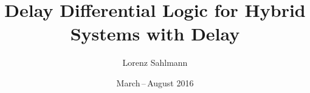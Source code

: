 \documentclass[
    final,
    fontsize=10pt,
    a4paper,
    oneside,
    abstract=on,
    toc=bibliographynumbered
]{scrreprt}
\newcommand*{\cdepartment}{}%
\newcommand*{\department}[1]{\gdef\cdepartment{#1}}
\newcommand*{\cinstitution}{}%
\newcommand*{\institution}[1]{\gdef\cinstitution{#1}}
\newcommand*{\csupervisor}{}%
\newcommand*{\supervisor}[1]{\gdef\csupervisor{#1}}
\newcommand*{\csupervisorinst}{}%
\newcommand*{\supervisorinst}[1]{\gdef\csupervisorinst{#1}}
\newcommand*{\cscndsupervisor}{}%
\newcommand*{\scndsupervisor}[1]{\gdef\cscndsupervisor{#1}}
\newcommand*{\cscndsupervisorinst}{}%
\newcommand*{\scndsupervisorinst}[1]{\gdef\cscndsupervisorinst{#1}}
\renewcommand{\maketitle}{}
\begin{document}
\department{Master Comasic}
\institution{École Polytechnique}
\subject{Stage de Recherche\\ at\\ Carnegie Mellon University}
\title{Delay Differential Logic for Hybrid Systems with Delay}
\author{Lorenz Sahlmann}
\date{March\,--\,August 2016}
\supervisor{Prof.~Dr.~André Platzer}
\supervisorinst{Carnegie Mellon University}
\scndsupervisor{Prof.~Eric Goubault}
\scndsupervisorinst{École Polytechnique}

\maketitle

% 




% 







% 

% 

\appendix

\nocite{Fulton16LogicProofs,*}


\end{document}
